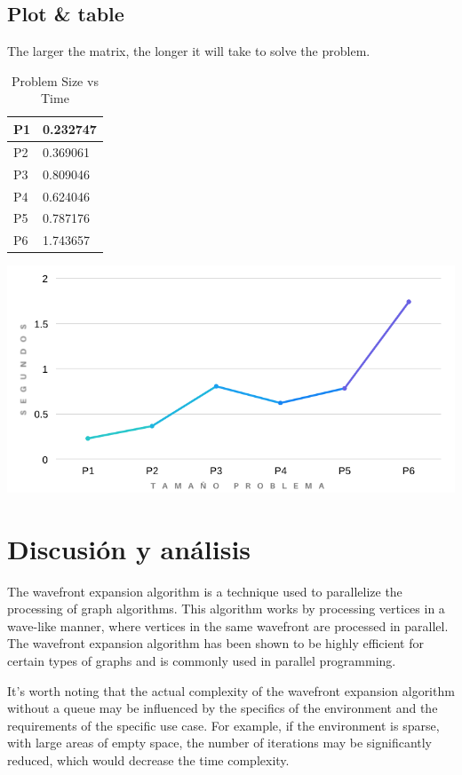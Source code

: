 \documentclass[oneside,twocolumn]{article}
\begin{document}
\subsection{Plot \& table}

The larger the matrix, the longer it will take to solve the problem.

\begin{table}[!hbt]
  \caption{Problem Size vs Time}
  \centering
  \begin{tabular}{|l|l|}
    \hline
    P1 & 0.232747 \\ \hline
    P2 & 0.369061 \\ \hline
    P3 & 0.809046 \\ \hline
    P4 & 0.624046 \\ \hline
    P5 & 0.787176 \\ \hline
    P6 & 1.743657 \\ \hline
  \end{tabular}
\end{table}

\includegraphics[scale=0.27]{plot.png}

\section{Discusión y análisis}

The wavefront expansion algorithm is a technique used to parallelize the processing of graph algorithms. This algorithm works by processing vertices in a wave-like manner, where vertices in the same wavefront are processed in parallel. The wavefront expansion algorithm has been shown to be highly efficient for certain types of graphs and is commonly used in parallel programming.

It's worth noting that the actual complexity of the wavefront expansion algorithm without a queue may be influenced by the specifics of the environment and the requirements of the specific use case. For example, if the environment is sparse, with large areas of empty space, the number of iterations may be significantly reduced, which would decrease the time complexity.\\
\end{document}
